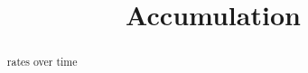 \documentclass{ximera}
\title{Accumulation}
\begin{document}
\begin{abstract}
rates over time
\end{abstract}
\maketitle
\end{document}
